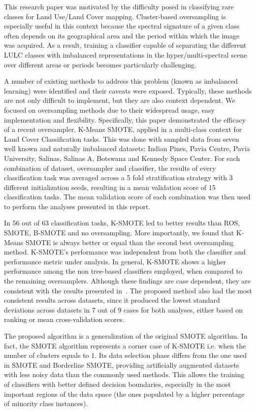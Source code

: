 \documentclass[parskip=full]{scrartcl}
\begin{document}
This research paper was motivated by the difficulty posed in classifying rare
classes for Land Use/Land Cover mapping. Cluster-based oversampling is
especially useful in this context because the spectral signature of a given
class often depends on its geographical area and the period within which the
image was acquired. As a result, training a classifier capable of separating
the different LULC classes with imbalanced representations in the
hyper/multi-spectral scene over different areas or periods becomes
particularly challenging.

A number of existing methods to address this problem (known as imbalanced
learning) were identified and their caveats were exposed. Typically, these
methods are not only difficult to implement, but they are also context
dependent. We focused on oversampling methods due to their widespread usage,
easy implementation and flexibility. Specifically, this paper demonstrated
the efficacy of a recent oversampler, K-Means SMOTE, applied in a multi-class
context for Land Cover Classification tasks. This was done with sampled data
from seven well known and naturally imbalanced datasets: Indian Pines, Pavia
Centre, Pavia University, Salinas, Salinas A, Botswana and Kennedy Space
Center. For each combination of dataset, oversampler and classifier, the
results of every classification task was averaged across a 5 fold
stratification strategy with 3 different initialization seeds, resulting in a
mean validation score of 15 classification tasks. The mean validation score of
each combination was then used to perform the analyses presented in this
report.

In 56 out of 63 classification tasks, K-SMOTE led to better results than ROS,
SMOTE, B-SMOTE and no oversampling. More importantly, we found that K-Means
SMOTE is always better or equal than the second best oversampling method.
K-SMOTE's performance was independent from both the classifier and performance
metric under analysis. In general, K-SMOTE shows a higher performance among
the non tree-based classifiers employed, when compared to the remaining
oversamplers. Although these findings are case dependent, they are consistent
with the results presented in~\cite{Douzas2018}. The proposed method also had
the most consistent results across datasets, since it produced the lowest
standard deviations across datasets in 7 out of 9 cases for both analyses,
either based on ranking or mean cross-validation scores.

The proposed algorithm is a generalization of the original SMOTE algorithm. In
fact, the SMOTE algorithm represents a corner case of K-SMOTE i.e. when the
number of clusters equals to 1. Its data selection phase differs from the one
used in SMOTE and Borderline SMOTE, providing artificially augmented datasets
with less noisy data than the commonly used methods. This allows the training
of classifiers with better defined decision boundaries, especially in the most
important regions of the data space (the ones populated by a higher percentage
of minority class instances).
\end{document}
